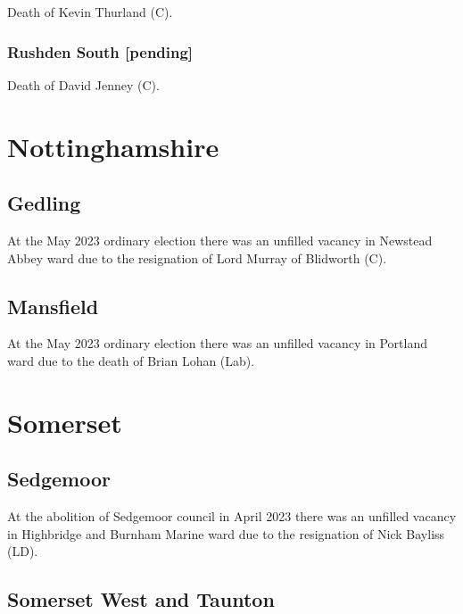 \documentclass[a4paper,openany]{book}
\begin{document}
\begin{resultsiii}
Death of Kevin Thurland (C).

\subsubsection*{Rushden South \hspace*{\fill}\nolinebreak[1]%
	\enspace\hspace*{\fill}
	[pending]}


Death of David Jenney (C).

\section{Nottinghamshire}

\subsection*{Gedling}

At the May 2023 ordinary election there was an unfilled vacancy in Newstead Abbey ward due to the resignation of Lord Murray of Blidworth (C).%

\subsection*{Mansfield}

At the May 2023 ordinary election there was an unfilled vacancy in Portland ward due to the death of Brian Lohan (Lab).%

\section{Somerset}

\subsection*{Sedgemoor}

At the abolition of Sedgemoor council in April 2023 there was an unfilled vacancy in Highbridge and Burnham Marine ward due to the resignation of Nick Bayliss (LD).%

\subsection*{Somerset West and Taunton}


\end{resultsiii}
\end{document}

